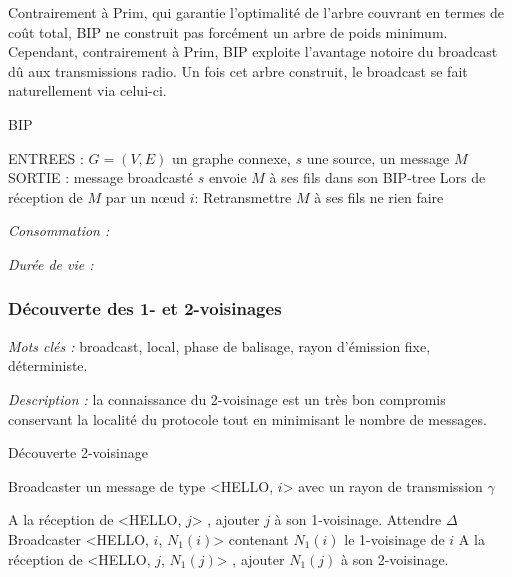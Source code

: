 Contrairement à Prim, qui garantie l'optimalité de l'arbre couvrant en termes de coût total,
BIP ne construit pas forcément un arbre de poids minimum. Cependant, contrairement à Prim, BIP exploite l'avantage notoire du broadcast dû aux transmissions radio. Un fois cet arbre construit, le broadcast se fait naturellement via celui-ci.


\begin{algorithm}[h]
\caption{BIP}
\label{algo_BIP}
\begin{algorithmic}
\STATE ENTREES :  $G=(V,E)$ un graphe connexe, $s$ une source, un message $M$
\STATE SORTIE : message broadcasté
\STATE $s$ envoie $M$ à ses fils dans son BIP-tree
\STATE Lors de réception de $M$ par un nœud $i$:
	\STATE Retransmettre $M$ à ses fils
\ELSE
	\STATE ne rien faire
\ENDIF
\end{algorithmic}
\end{algorithm}



\emph{Consommation :} 

\emph{Durée de vie :} 



\subsubsection{Découverte des 1- et 2-voisinages}

\emph{Mots clés :} broadcast, local, phase de balisage, rayon d'émission fixe, déterministe.

\emph{Description :} la connaissance du 2-voisinage est un très bon compromis conservant la localité du protocole tout en minimisant le nombre de messages.


\begin{algorithm}[h]
\caption{Découverte 2-voisinage}
\label{algo_k_voisinage}
\begin{algorithmic}

	\STATE Broadcaster un message de type <HELLO, $i$> avec un rayon de transmission $\gamma$
\ENDFOR

\STATE A la réception de <HELLO, $j$> , ajouter $j$ à son 1-voisinage.
\STATE Attendre $\Delta$
	\STATE Broadcaster <HELLO, $i$, $N_1(i)$> contenant $N_1(i)$ le 1-voisinage de $i$
	\STATE A la réception de <HELLO, $j$, $N_1(j)$> , ajouter $N_1(j)$ à son 2-voisinage.
	
\ENDFOR
\end{algorithmic}
\end{algorithm}



